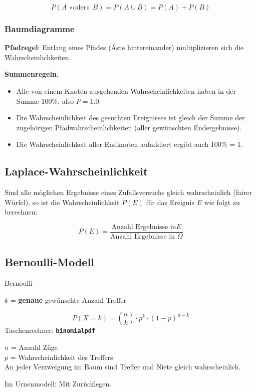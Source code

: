 \begin{multicols}{2}
$$P(A\textrm{ «oder» }B) = P(A\cup B) = P(A) + P(B)$$


\subsubsection*{Baumdiagramme}

\textbf{Pfadregel}:
Entlang eines Pfades (Äste hintereinander) multiplizieren sich die
Wahrscheinlichkeiten.

\textbf{Summenregeln}:
\begin{itemize}
\item Alle von einem Knoten ausgehenden Wahrscheinlichkeiten haben in
der Summe 100\%, also $P=1.0$.
\item Die Wahrscheinlichkeit des gesuchten Ereignisses ist gleich der
Summe der zugehörigen Pfadwahrscheinlichkeiten (aller gewünschten
Endergebnisse).
\item Die Wahrscheinlichkeit aller Endknoten aufaddiert ergibt auch
100\% = 1.
\end{itemize}


\subsection*{Laplace-Wahrscheinlichkeit}
Sind alle möglichen Ergebnisse eines Zufallsversuchs gleich
wahrscheinlich (fairer Würfel), so ist die Wahrscheinlichkeit $P(E)$ für das Ereignis
$E$ wie folgt zu berechnen:

$$P(E) = \frac{\textrm{Anzahl Ergebnisse in
}E}{\textrm{Anzahl Ergebnisse in }\Omega}$$


\subsection*{Bernoulli-Modell}
\begin{gesetz*}{Bernoulli}{}

$k$ = \textbf{genaue} gewünschte Anzahl Treffer

$$P(X=k) = {n \choose k}\cdot{}p^k\cdot{}(1-p)^{n-k}$$
Taschenrechner:  \textbf{\texttt{binomialpdf}}

$n$ = Anzahl Züge\\
$p$ = Wahrscheinlichkeit des Treffers\\

An jeder Verzweigung im Baum sind Treffer und Niete gleich
wahrscheinlich.

Im Urnenmodell: Mit Zurücklegen.
\end{gesetz*}


\end{multicols}
